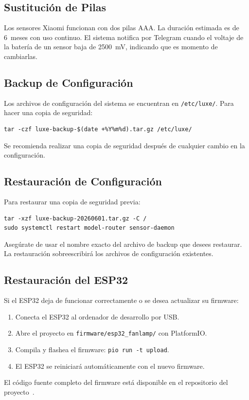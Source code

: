 \subsection{Sustitución de Pilas}
Los sensores Xiaomi funcionan con dos pilas AAA. La duración estimada es de 6~meses con uso continuo. El sistema notifica por Telegram cuando el voltaje de la batería de un sensor baja de 2500~mV, indicando que es momento de cambiarlas.

\subsection{Backup de Configuración}
Los archivos de configuración del sistema se encuentran en \texttt{/etc/luxe/}. Para hacer una copia de seguridad:
\begin{verbatim}
tar -czf luxe-backup-$(date +%Y%m%d).tar.gz /etc/luxe/
\end{verbatim}
Se recomienda realizar una copia de seguridad después de cualquier cambio en la configuración.

\subsection{Restauración de Configuración}
Para restaurar una copia de seguridad previa:
\begin{verbatim}
tar -xzf luxe-backup-20260601.tar.gz -C /
sudo systemctl restart model-router sensor-daemon
\end{verbatim}
Asegúrate de usar el nombre exacto del archivo de backup que desees restaurar. La restauración sobreescribirá los archivos de configuración existentes.

\subsection{Restauración del ESP32}
Si el ESP32 deja de funcionar correctamente o se desea actualizar su firmware:
\begin{enumerate}
    \item Conecta el ESP32 al ordenador de desarrollo por USB.
    \item Abre el proyecto en \texttt{firmware/esp32\_fanlamp/} con PlatformIO.
    \item Compila y flashea el firmware: \texttt{pio run -t upload}.
    \item El ESP32 se reiniciará automáticamente con el nuevo firmware.
\end{enumerate}
El código fuente completo del firmware está disponible en el repositorio del proyecto~\cite{repo_publico}.

